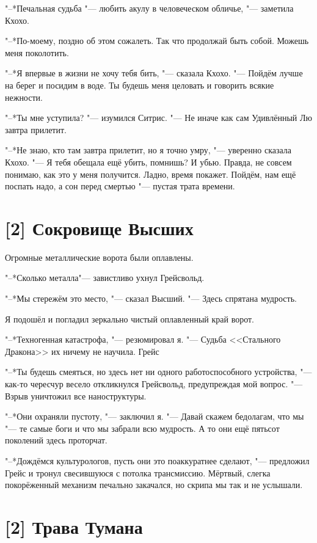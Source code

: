 "--*Печальная судьба "--- любить акулу в человеческом обличье, "--- заметила Кхохо.

"--*По-моему, поздно об этом сожалеть.
Так что продолжай быть собой.
Можешь меня поколотить.

"--*Я впервые в жизни не хочу тебя бить, "--- сказала Кхохо.
"--- Пойдём лучше на берег и посидим в воде.
Ты будешь меня целовать и говорить всякие нежности.

"--*Ты мне уступила? "--- изумился Ситрис.
"--- Не иначе как сам Удивлённый Лю завтра прилетит.

"--*Не знаю, кто там завтра прилетит, но я точно умру, "--- уверенно сказала Кхохо.
"--- Я тебя обещала ещё убить, помнишь?
И убью.
Правда, не совсем понимаю, как это у меня получится.
Ладно, время покажет.
Пойдём, нам ещё поспать надо, а сон перед смертью "--- пустая трата времени.

\section{[2] Сокровище Высших}

Огромные металлические ворота были оплавлены.

"--*Сколько металла\ldotst "--- завистливо ухнул Грейсвольд.

"--*Мы стережём это место, "--- сказал Высший.
"--- Здесь спрятана мудрость.

Я подошёл и погладил зеркально чистый оплавленный край ворот.

"--*Техногенная катастрофа, "--- резюмировал я.
"--- Судьба <<Стального Дракона>> их ничему не научила.
Грейс\ldotst

"--*Ты будешь смеяться, но здесь нет ни одного работоспособного устройства, "--- как-то чересчур весело откликнулся Грейсвольд, предупреждая мой вопрос.
"--- Взрыв уничтожил все наноструктуры.

"--*Они охраняли пустоту, "--- заключил я.
"--- Давай скажем бедолагам, что мы "--- те самые боги и что мы забрали всю мудрость.
А то они ещё пятьсот поколений здесь проторчат.

"--*Дождёмся культурологов, пусть они это поаккуратнее сделают, "--- предложил Грейс и тронул свесившуюся с потолка трансмиссию.
Мёртвый, слегка покорёженный механизм печально закачался, но скрипа мы так и не услышали.

\section{[2] Трава Тумана}

